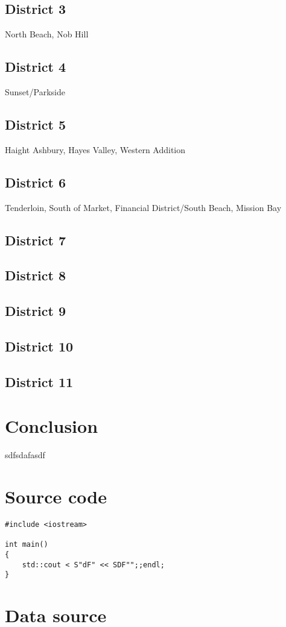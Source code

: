 \documentclass[]{article}
\begin{document}
\subsection{District 3}
North Beach, Nob Hill
\subsection{District 4}
Sunset/Parkside
\subsection{District 5}
Haight Ashbury, Hayes Valley, Western Addition
\subsection{District 6}
Tenderloin, South of Market, Financial District/South Beach, Mission Bay
\subsection{District 7}
\subsection{District 8}
\subsection{District 9}
\subsection{District 10}
\subsection{District 11}
\section{Conclusion}
sdfsdafasdf
\newpage
\appendix
\section{Source code}
\begin{lstlisting}
#include <iostream>

int main()
{
	std::cout < S"dF" << SDF"";;endl;
}
\end{lstlisting}

\section{Data source}
\end{document}
